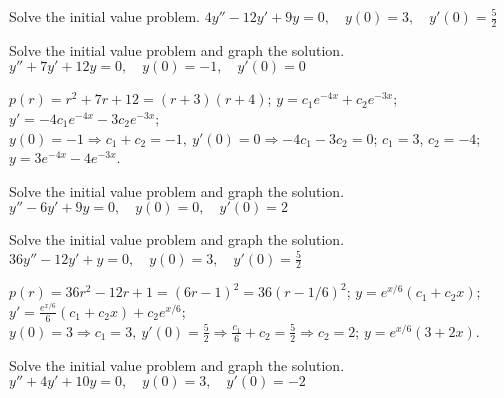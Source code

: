 \documentclass{ximera}
\begin{document}
\begin{problem}\label{exer:5.2.17}  Solve
the initial value problem.
$4y''-12y'+9y=0, \quad  y(0)=3,\quad y'(0)=\frac{5}{2}$
\end{problem} 

\begin{problem}\label{exer:5.2.18} Solve
the initial value problem and graph the solution.
$y''+7y'+12y=0, \quad  y(0)=-1,\quad y'(0)=0$
\begin{solution}
$p(r)=r^2+7r+12=(r+3)(r+4)$;\;
$y=c_1e^{-4x}+c_2e^{-3x}$;\;
$y'=-4c_1e^{-4x}-3c_2e^{-3x}$;\;
 $y(0)=-1\Rightarrow c_1+c_2=-1,\ y'(0)=0\Rightarrow -4c_1-3c_2=0$;\;
$c_1=3$, $c_2=-4$;\;
$y=3e^{-4x}-4e^{-3x}$.
\end{solution}
\end{problem} 

\begin{problem}\label{exer:5.2.19} Solve
the initial value problem and graph the solution.
$y''-6y'+9y=0, \quad  y(0)=0,\quad y'(0)=2$
\end{problem} 

\begin{problem}\label{exer:5.2.20} Solve
the initial value problem and graph the solution.
$36y''-12y'+y=0, \quad  y(0)=3,\quad y'(0)=\frac{5}{2}$
\begin{solution}
$p(r)=36r^2-12r+1=(6r-1)^2=36(r-1/6)^2$;\;
$y=e^{x/6}(c_1+c_2x)$;\;
$y'=\frac{e^{x/6}}{6}(c_1+c_2x)+c_2e^{x/6}$;\;
$y(0)=3\Rightarrow c_1=3,\ y'(0)=\frac{5}{2}\Rightarrow
\frac{c_1}{6}+c_2=\frac{5}{2}\Rightarrow c_2=2$;\;
$y=e^{x/6}(3+2x)$.
\end{solution}
\end{problem} 

\begin{problem}\label{exer:5.2.21} Solve
the initial value problem and graph the solution.
$y''+4y'+10y=0, \quad  y(0)=3,\quad y'(0)=-2$
\end{problem} 
\end{document}
